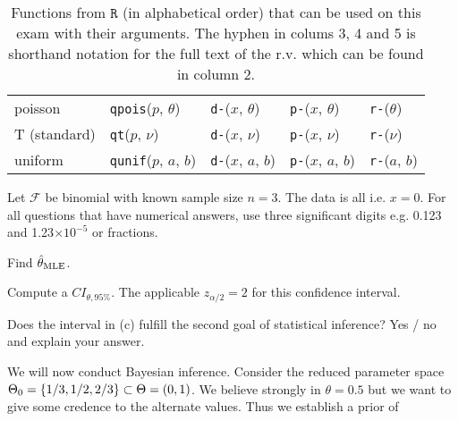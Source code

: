 \documentclass[12pt]{article}
\begin{document}
\begin{table}[htp]
\begin{tabular}{l | llll}

poisson & \texttt{qpois}($p$, $\theta$) 
& \texttt{d-}($x$, $\theta$)
& \texttt{p-}($x$, $\theta$) 
& \texttt{r-}($\theta$) \\

T (standard) & \texttt{qt}($p$, $\nu$) 
& \texttt{d-}($x$, $\nu$) 
& \texttt{p-}($x$, $\nu$)
& \texttt{r-}($\nu$) \\


uniform & \texttt{qunif}($p$, $a$, $b$) 
& \texttt{d-}($x$, $a$, $b$)
& \texttt{p-}($x$, $a$, $b$) 
& \texttt{r-}($a$, $b$) \\


\end{tabular}
\caption{Functions from $\texttt{R}$ (in alphabetical order) that can be used on this exam with their arguments. The hyphen in colums 3, 4 and 5 is shorthand notation for the full text of the r.v. which can be found in column 2.
}
\label{tab:eqs}
\end{table}

\problem Let $\mathcal{F}$ be binomial with known sample size $n = 3$. The data is all  i.e. $x = 0$. For all questions that have numerical answers, use three significant digits e.g. 0.123 and 1.23$\times 10^{-5}$ or fractions.

\benum

 Find $\hat{\theta}_{\mathrm{MLE}}$. 


 Compute a $CI_{\theta, 95\%}$. The applicable $z_{\alpha/2} = 2$ for this confidence interval. 

 Does the interval in (c) fulfill the second goal of statistical inference? Yes / no and explain your answer. 


 We will now conduct Bayesian inference. Consider the reduced parameter space $\Theta_0 = \left\{1/3, 1/2, 2/3\right\} \subset \Theta = (0, 1)$. We believe strongly in $\theta = 0.5$ but we want to give some credence to the alternate values. Thus we establish a prior of 
\end{document}
